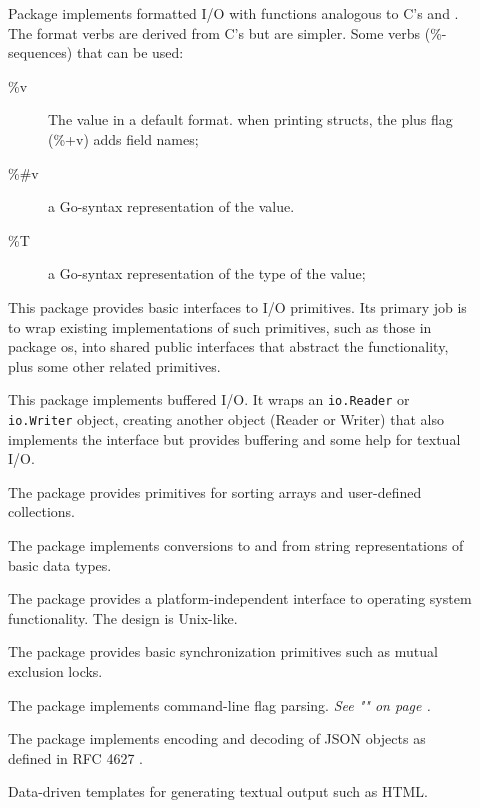 \begin{description}
\item[]{
Package  implements formatted I/O with functions analogous
to C's  and . The format verbs are derived
from C's but are simpler. Some verbs (\%-sequences) that can be used:

\begin{description}
\item[\%v]{The value in a default format.
when printing structs, the plus flag (\%+v) adds field names;}
\item[\%\#v]{a Go-syntax representation of the value.}
\item[\%T]{a Go-syntax representation of the type of the value;}
\end{description}

}

\item[]{
This package provides basic interfaces to I/O primitives.
Its primary job is to wrap existing implementations of such primitives,
such as those in package os, into shared public interfaces that
abstract the functionality, plus some other related primitives.
}
\item[]{
This package implements buffered I/O.  It wraps an 
\lstinline{io.Reader}
or
\lstinline{io.Writer}
object, creating another object (Reader or Writer) that also implements
the interface but provides buffering and some help for textual I/O.
}
\item[]{
The  package provides primitives for sorting arrays
and user-defined collections.
}
\item[]{
The  package implements conversions to and from
string representations of basic data types.
}
\item[]{
The  package provides a platform-independent interface to operating
system functionality.  The design is Unix-like.
}
\item[]{
The package  provides basic synchronization primitives such as mutual
exclusion locks. 
}
\item[]{
The  package implements command-line flag parsing. 
\emph{See ""
on page \pageref{sec:option parsing}.}
}
\item[]{
The  package implements encoding and decoding of JSON objects as
defined in RFC 4627 \cite{RFC4627}.
}
\item[]{
Data-driven templates for generating textual output such as HTML.

}
\end{description}
